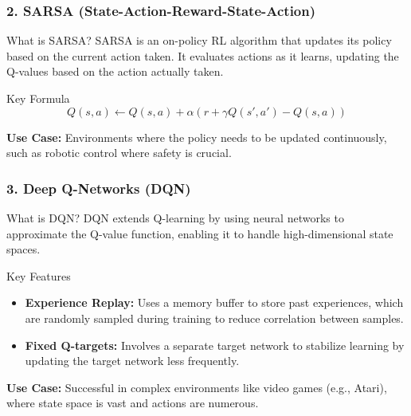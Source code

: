 \documentclass{beamer}
\begin{document}
\begin{frame}[fragile]
    \frametitle{2. SARSA (State-Action-Reward-State-Action)}
    \begin{block}{What is SARSA?}
        SARSA is an on-policy RL algorithm that updates its policy based on the current action taken. It evaluates actions as it learns, updating the Q-values based on the action actually taken.
    \end{block}

    \begin{block}{Key Formula}
        \begin{equation}
        Q(s, a) \leftarrow Q(s, a) + \alpha \left( r + \gamma Q(s', a') - Q(s, a) \right)
        \end{equation}
    \end{block}

    \textbf{Use Case:} Environments where the policy needs to be updated continuously, such as robotic control where safety is crucial.
\end{frame}

\begin{frame}[fragile]
    \frametitle{3. Deep Q-Networks (DQN)}
    \begin{block}{What is DQN?}
        DQN extends Q-learning by using neural networks to approximate the Q-value function, enabling it to handle high-dimensional state spaces.
    \end{block}
    
    \begin{block}{Key Features}
        \begin{itemize}
            \item \textbf{Experience Replay:} Uses a memory buffer to store past experiences, which are randomly sampled during training to reduce correlation between samples.
            \item \textbf{Fixed Q-targets:} Involves a separate target network to stabilize learning by updating the target network less frequently.
        \end{itemize}
    \end{block}

    \textbf{Use Case:} Successful in complex environments like video games (e.g., Atari), where state space is vast and actions are numerous.
\end{frame}
\end{document}
